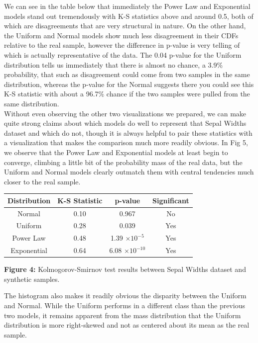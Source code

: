 We can see in the table below that immediately the Power Law and Exponential models stand out tremendously with K-S statistics above and around 0.5, both of which are disagreements that are very structural in nature. On the other hand, the Uniform and Normal models show much less disagreement in their CDFs relative to the real sample, however the difference in p-value is very telling of which is actually representative of the data. The 0.04 p-value for the Uniform distribution tells us immediately that there is almost no chance, a 3.9\% probability, that such as disagreement could come from two samples in the same distribution, whereas the p-value for the Normal suggests there you could see this K-S statistic with about a 96.7\% chance if the two samples were pulled from the same distribution.\\

Without even observing the other two visualizations we prepared, we can make quite strong claims about which models do well to represent that Sepal Widths dataset and which do not, though it is always helpful to pair these statistics with a visualization that makes the comparison much more readily obvious. In Fig 5, we observe that the Power Law and Exponential models at least begin to converge, climbing a little bit of the probability mass of the real data, but the Uniform and Normal models clearly outmatch them with central tendencies much closer to the real sample.\\

\begin{center}
\begin{tabular}{|c|c|c|c|}
\hline
\textbf{Distribution} & \textbf{K-S Statistic} & \textbf{p-value} & \textbf{Significant} \\
\hline
Normal & 0.10 & 0.967 & No \\
\hline
Uniform & 0.28 & 0.039 & Yes \\
\hline
Power Law & 0.48 & 1.39 $\times 10^{-5}$ & Yes \\
\hline
Exponential & 0.64 & 6.08 $\times 10^{-10}$ & Yes \\
\hline
\end{tabular}
\end{center}

\begin{center}
\textbf{Figure 4:} Kolmogorov-Smirnov test results between Sepal Widths dataset and synthetic samples.
\end{center}

The histogram also makes it readily obvious the disparity between the Uniform and Normal. While the Uniform performs in a different class than the previous two models, it remains apparent from the mass distribution that the Uniform distribution is more right-skewed and not as centered about its mean as the real sample.\\

